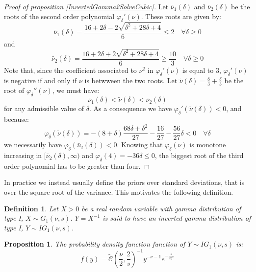 \documentclass{amsart}
\theoremstyle{plain}
\newtheorem{proposition}{Proposition}[section]
\newtheorem{definition}{Definition}[section]
\theoremstyle{remark}
\numberwithin{equation}{section}
\begin{document}
\begin{proof}[Proof of proposition \ref{InvertedGamma2SolveCubic}]
  Let $\bar\nu_1(\delta)$ and $\bar\nu_2(\delta)$ be the roots of the
  second order polynomial $\varphi_{\delta}'(\nu)$. These roots are
  given by:
  \[
    \bar\nu_1(\delta) = \frac{16+2\delta-2\sqrt{\delta^2+28\delta+4}}{6}\leq 2 \quad \forall \delta\geq 0
  \]
  and
  \[
    \bar\nu_2(\delta) = \frac{16+2\delta+2\sqrt{\delta^2+28\delta+4}}{6}\geq \frac{10}{3} \quad \forall \delta\geq 0
  \]
  Note that, since the coefficient associated to $\nu^2$ in
  $\varphi_{\delta}'(\nu)$ is equal to 3, $\varphi_{\delta}'(\nu)$ is
  negative if and only if $\nu$ is betwween the two roots.  Let
  $\tilde\nu(\delta) = \frac{8}{3}+\frac{\delta}{3}$ be the root of
  $\varphi_{\delta}''(\nu)$, we must have:
  \[
    \bar\nu_1(\delta) < \tilde\nu(\delta) < \bar\nu_2(\delta)
  \]
  for any admissible value of $\delta$. As a consequence we have $\varphi_{\delta}'(\tilde\nu(\delta))<0$, and because:
  \[
    \varphi_{\delta}(\tilde\nu(\delta)) = -(8+\delta)\frac{68\delta+\delta^2}{27}-\frac{16}{27}-\frac{56}{27}\delta <0 \quad \forall \delta
  \]
  we necessarily have $\varphi_{\delta}(\bar\nu_2(\delta))<0$. Knowing
  that $\varphi_{\delta}(\nu)$ is monotone increasing in
  $[\bar\nu_2(\delta), \infty)$ and
  $\varphi_{\delta}(4) = -36\delta \leq 0$, the biggest root of the
  third order polynomial has to be greater than four.
\end{proof}

In practice we instead usually define the priors over standard deviations, that is
over the square root of the variance. This motivates the following definition.\newline

\begin{definition}\label{InvertedGamma1}
  Let $X>0$ be a real random variable with gamma distribution of type I, $X\sim G_1\left(\nu,s\right)$. $Y = X^{-1}$ is said to have an inverted gamma distribution of type I, $Y\sim IG_1(\nu, s)$. 
\end{definition}

\begin{proposition}\label{InvertedGamma1Density}
  The probability density function function of $Y\sim IG_1(\nu, s)$ is:
  \[
    f(y) = \widetilde{\mathcal C}\left(\frac{\nu}{2}, \frac{2}{s}\right)^{-1}y^{-\nu-1}e^{-\frac{s}{2 y^2}}
  \]
\end{proposition}
\end{document}
